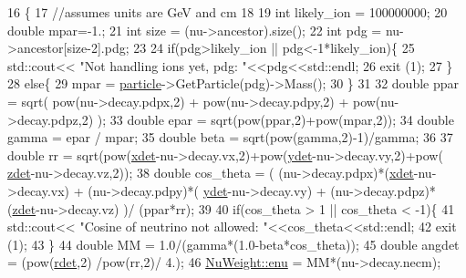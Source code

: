 \begin{DoxyCode}
16                                               \{
17      \textcolor{comment}{//assumes units are GeV and cm}
18 
19     \textcolor{keywordtype}{int} likely\_ion = 100000000;
20     \textcolor{keywordtype}{double} mpar=-1.;
21     \textcolor{keywordtype}{int} size = (nu->ancestor).size();
22     \textcolor{keywordtype}{int} pdg = nu->ancestor[size-2].pdg;
23 
24     \textcolor{keywordflow}{if}(pdg>likely\_ion || pdg<-1*likely\_ion)\{
25       std::cout<< \textcolor{stringliteral}{"Not handling ions yet, pdg: "}<<pdg<<std::endl;
26       exit (1);
27     \}
28     \textcolor{keywordflow}{else}\{
29       mpar = \hyperlink{class_neutrino_flux_auxiliar_1_1_nu_weight_aa35fc1d624cd975a9657f1a081a776ca}{particle}->GetParticle(pdg)->Mass();
30     \}
31     
32     \textcolor{keywordtype}{double} ppar  = sqrt( pow(nu->decay.pdpx,2) + pow(nu->decay.pdpy,2) + pow(nu->decay.pdpz,2) );
33     \textcolor{keywordtype}{double} epar  = sqrt(pow(ppar,2)+pow(mpar,2));
34     \textcolor{keywordtype}{double} gamma = epar / mpar;
35     \textcolor{keywordtype}{double} beta = sqrt(pow(gamma,2)-1)/gamma;
36 
37     \textcolor{keywordtype}{double} rr = sqrt(pow(\hyperlink{class_neutrino_flux_auxiliar_1_1_nu_weight_a9ea8df1e61c18a5a795746c182c31a5a}{xdet}-nu->decay.vx,2)+pow(\hyperlink{class_neutrino_flux_auxiliar_1_1_nu_weight_a4041206ba690070b210e5d8b28497c56}{ydet}-nu->decay.vy,2)+pow(
      \hyperlink{class_neutrino_flux_auxiliar_1_1_nu_weight_a4e33b89875dd565737b9a35e201b4585}{zdet}-nu->decay.vz,2));
38     \textcolor{keywordtype}{double} cos\_theta = ( (nu->decay.pdpx)*(\hyperlink{class_neutrino_flux_auxiliar_1_1_nu_weight_a9ea8df1e61c18a5a795746c182c31a5a}{xdet}-nu->decay.vx) + (nu->decay.pdpy)*(
      \hyperlink{class_neutrino_flux_auxiliar_1_1_nu_weight_a4041206ba690070b210e5d8b28497c56}{ydet}-nu->decay.vy) + (nu->decay.pdpz)*(\hyperlink{class_neutrino_flux_auxiliar_1_1_nu_weight_a4e33b89875dd565737b9a35e201b4585}{zdet}-nu->decay.vz) )/ (ppar*rr);
39  
40     \textcolor{keywordflow}{if}(cos\_theta > 1 || cos\_theta < -1)\{
41       std::cout<< \textcolor{stringliteral}{"Cosine of neutrino not allowed: "}<<cos\_theta<<std::endl;
42       exit (1);
43     \}
44     \textcolor{keywordtype}{double} MM      = 1.0/(gamma*(1.0-beta*cos\_theta));
45     \textcolor{keywordtype}{double} angdet  = (pow(\hyperlink{_nu_weight_8cpp_ae7afe156db7f7ccfcf48729eb3817b69}{rdet},2) /pow(rr,2)/ 4.); 
46     \hyperlink{class_neutrino_flux_auxiliar_1_1_nu_weight_aaf30ef23c7cf98ecbda310a777d0b8aa}{NuWeight::enu}  =  MM*(nu->decay.necm);

\end{DoxyCode}
